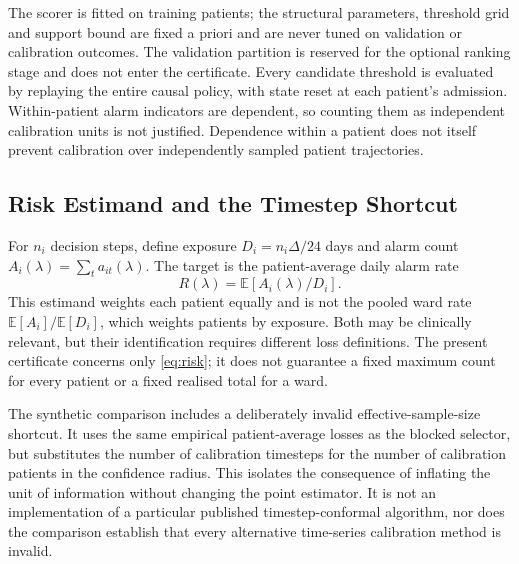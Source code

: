 The scorer is fitted on training patients; the structural parameters, threshold grid and support bound are fixed a priori and are never tuned on validation or calibration outcomes. The validation partition is reserved for the optional ranking stage and does not enter the certificate. Every candidate threshold is evaluated by replaying the entire causal policy, with state reset at each patient's admission. Within-patient alarm indicators are dependent, so counting them as independent calibration units is not justified. Dependence within a patient does not itself prevent calibration over independently sampled patient trajectories.

\subsection{Risk Estimand and the Timestep Shortcut}

For $n_i$ decision steps, define exposure $D_i=n_i\Delta/24$ days and alarm count $A_i(\lambda)=\sum_t a_{it}(\lambda)$. The target is the patient-average daily alarm rate
\begin{equation}
\label{eq:risk}
R(\lambda)=\mathbb{E}\!\left[A_i(\lambda)/D_i\right].
\end{equation}
This estimand weights each patient equally and is not the pooled ward rate $\mathbb{E}[A_i]/\mathbb{E}[D_i]$, which weights patients by exposure. Both may be clinically relevant, but their identification requires different loss definitions. The present certificate concerns only \cref{eq:risk}; it does not guarantee a fixed maximum count for every patient or a fixed realised total for a ward.

The synthetic comparison includes a deliberately invalid effective-sample-size shortcut. It uses the same empirical patient-average losses as the blocked selector, but substitutes the number of calibration timesteps for the number of calibration patients in the confidence radius. This isolates the consequence of inflating the unit of information without changing the point estimator. It is not an implementation of a particular published timestep-conformal algorithm, nor does the comparison establish that every alternative time-series calibration method is invalid.
